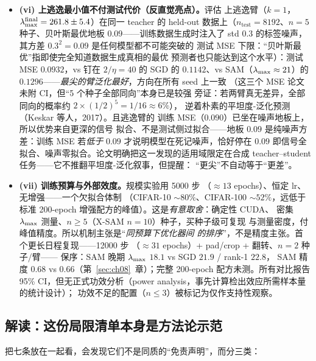 \begin{itemize}
        精确钉住不主张（第~\ref{sec:ch08}~章的双结局读法）。
  \item \textbf{(vi) 上逃逸最小值不付测试代价（反直觉亮点）。}评估
        上逃逸臂（$k=1$，$\lambda_{\max}^{\mathrm{final}}=261.8\pm5.4$）在同一
        teacher 的 held-out 数据上（$n_{\mathrm{test}}=8192$、$n=5$
        种子、贝叶斯最优地板 $0.09$——训练数据生成时注入了 std $0.3$
        的标签噪声，其方差 $0.3^{2}=0.09$ 是任何模型都不可能突破的
        测试 MSE 下限：“贝叶斯最优”指即使完全知道数据生成真相的最优
        预测者也只能达到这个水平）：测试 MSE $0.0932$，vs 钉在
        $2/\eta=40$ 的 SGD 的 $0.1142$、vs SAM（$\lambda_{\max}\approx21$）的
        $0.1296$——\emph{最尖的臂泛化最好}，方向在所有 seed 上一致
        （这三个 MSE 论文未附 CI，但``5 个种子全部同向''本身已是较强
        旁证：若两臂真无差异，全部同向的概率约
        $2\times(1/2)^{5}=1/16\approx6\%$），
        逆着朴素的平坦度-泛化预测（Keskar 等人，2017）。且逃逸臂的
        训练 MSE（$0.090$）已坐在噪声地板上，所以优势来自更深的信号
        拟合、不是测试侧过拟合——地板 $0.09$ 是纯噪声方差：训练 MSE
        若\emph{低于} $0.09$ 才说明模型在死记噪声，恰好停在 $0.09$
        即信号全拟合、噪声零拟合。论文明确把这一发现的适用域限定在合成
        teacher--student 任务——它不推翻平坦度-泛化叙事，但提醒：
        “更尖”不自动等于“更差”。
  \item \textbf{(vii) 训练预算与外部效度。}规模实验用 5000 步
        （${\approx}13$ epochs）、恒定 lr、无增强——一个欠拟合体制
        （CIFAR-10 ${\sim}80\%$、CIFAR-100 ${\sim}52\%$，远低于标准
        200-epoch 增强配方的峰值）。这是\emph{有意取舍}：确定性 CUDA、
        密集 $\lambda_{\max}$ 测量、$n\ge5$（X-SAM $n=10$）种子，买种子级可复现
        与测量密度，付峰值精度。所以机制主张是“\emph{同预算下优化器间
        的排序}”，不是精度主张。首个更长日程复现——12000 步
        （${\approx}31$ epochs）+ pad/crop + 翻转、$n=2$ 种子/臂——
        保序：SAM 晚期 $\lambda_{\max}$ $18.1$ vs SGD $21.9$ / rank-1 $22.8$，
        SAM 精度 $0.68$ vs $0.66$（第~\ref{sec:ch08}~章）；完整
        200-epoch 配方未测。所有对比报告 95\% CI，但无正式功效分析（power analysis，事先计算检出效应所需样本量的统计设计）；
        功效不足的配置（$n\le3$）被标记为仅作支持性观察。
\end{itemize}

\subsection{解读：这份局限清单本身是方法论示范}\label{sec:ch10-reading}

把七条放在一起看，会发现它们不是同质的“免责声明”，而分三类：

